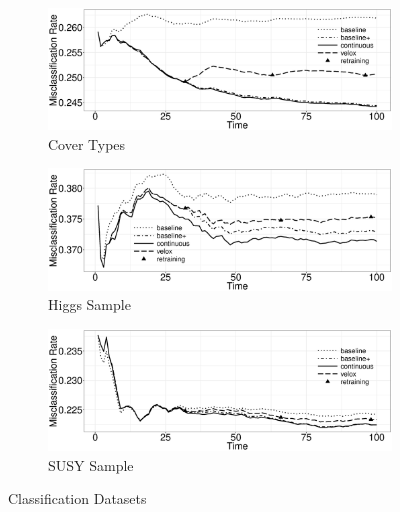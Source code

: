 \documentclass{vldb}
\begin{document}
\begin{figure}[h]
	\centering
\begin{subfigure}[b]{\columnwidth}
	\includegraphics[width=\columnwidth]{../images/experiment-results/cover-types-quality.eps}
	\caption{Cover Types}
	\label{fig:cover-types-quality}
\end{subfigure}
\begin{subfigure}[b]{\columnwidth}
  	\includegraphics[width=\columnwidth]{../images/experiment-results/higgs-sample-quality.eps}
	\caption{Higgs Sample}
	\label{fig:higgs-sample-quality}
\end{subfigure}
\begin{subfigure}[b]{\columnwidth}
  	\includegraphics[width=\columnwidth]{../images/experiment-results/susy-sample-quality.eps}
	\caption{SUSY Sample}
	\label{fig:susy-sample-quality}
\end{subfigure}
\caption{Classification Datasets }
\label{fig:local-classification-results}
\end{figure}
\end{document}
